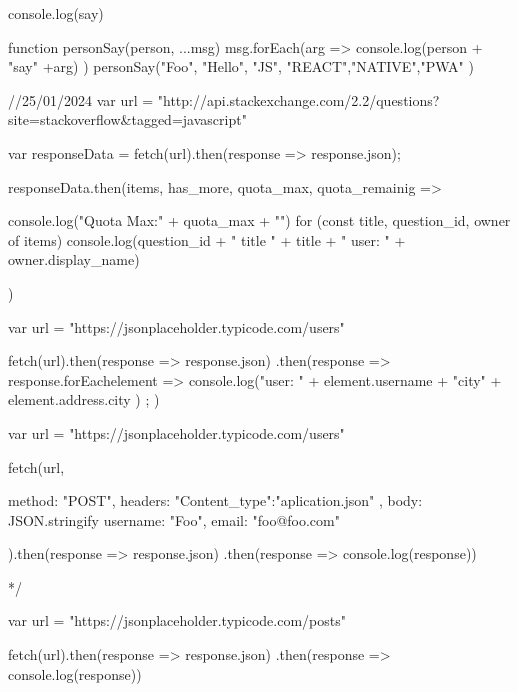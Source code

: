 console.log(say)


function personSay(person, ...msg){
    msg.forEach(arg => {
        console.log(person + "say" +arg)
    })
}
personSay("Foo", "Hello", "JS", "REACT","NATIVE","PWA" )



//25/01/2024
var url = "http://api.stackexchange.com/2.2/questions?site=stackoverflow&tagged=javascript"

var responseData = fetch(url).then(response => response.json{});

responseData.then({{items, has_more, quota_max, quota_remainig}} => {
    console.log("Quota Max:" + quota_max + "\n")
        for (const {title, question_id, owner} of items) {
            console.log(question_id + " title " + title + " user: "
            + owner.display_name)
        }

})


var url = "https://jsonplaceholder.typicode.com/users"

fetch(url).then(response => response.json{})
    .then(response => {
        response.forEach{element => {
            console.log("user: " + element.username
            + "city" + element.address.city )
        }};
    })


var url = "https://jsonplaceholder.typicode.com/users"

fetch(url, {
    method: "POST",
    headers: {
        "Content_type":"aplication.json"
    },
    body: JSON.stringify{{
        username: "Foo",
        email: "foo@foo.com"
    }}

}).then(response => response.json{})
    .then(response => console.log(response))

*/


var url = "https://jsonplaceholder.typicode.com/posts"

fetch(url).then(response => response.json{})
    .then(response => console.log(response))



